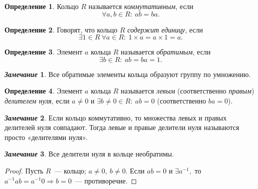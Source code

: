 \documentclass[a4paper, 14pt]{extarticle}
\newcommand{\suchthat}{{:}{ } \ }
\theoremstyle{definition}
\newtheorem*{remark}{\textit{Замечание}}
\newtheorem{definition}{Определение}
\theoremstyle{plain}
\numberwithin{theorem}{section}
\numberwithin{definition}{section}
\numberwithin{statement}{section}
\numberwithin{lemma}{section}
\numberwithin{consequence}{section}
\begin{document}
        \begin{comment}
        \begin{definition}
            Кольцо $R$ называется \textit{ассоциативным}, если 
		\begin{equation*}
			\forall a, b, c \in R\suchthat (ab)c = a(bc).
		\end{equation*}
	\end{definition}
        \end{comment}
	\begin{definition}
		Кольцо $R$ называется \textit{коммутативным}, если 
		\begin{equation*}
			\forall a, b \in R\suchthat ab = ba.
		\end{equation*}
	\end{definition}
        \begin{definition}
            Говорят, что кольцо $R$ \textit{содержит единицу}, если
            \begin{equation*}
                \exists 1 \in R \ \forall a \in R\suchthat 1 \times a = a \times 1 = a.
            \end{equation*}
        \end{definition}
	\begin{definition}
		Элемент $a$ кольца $R$ называется \textit{обратимым}, если 
		\begin{equation*}
			\exists b \in R \suchthat ab = ba = 1.
		\end{equation*}
	\end{definition}
	\begin{remark}
		Все обратимые элементы кольца образуют группу по умножению.
	\end{remark}
	\begin{definition}
		Элемент $a$ кольца $R$ называется \textit{левым} (соответственно \textit{правым}) \textit{делителем нуля}, если ${a \neq 0}$ и ${\exists b \neq 0 \in R \suchthat ab = 0}$ (соответственно $ba = 0$).
	\end{definition}
	\begin{remark}
		Если кольцо коммутативно, то множества левых и правых делителей нуля совпадают. Тогда левые и правые делители нуля называются просто «делителями нуля».
	\end{remark}
	\begin{remark}
		Все делители нуля в кольце необратимы.
	\end{remark}
	\begin{proof}
		Пусть $R$~--- кольцо; ${a \neq 0, \ b \neq 0.}$ Если ${ab = 0}$ и ${\exists a^{-1},}$ то ${a^{-1}ab = a^{-1}0 \Longrightarrow b = 0}$~--- противоречие.
	\end{proof}
\end{document}
